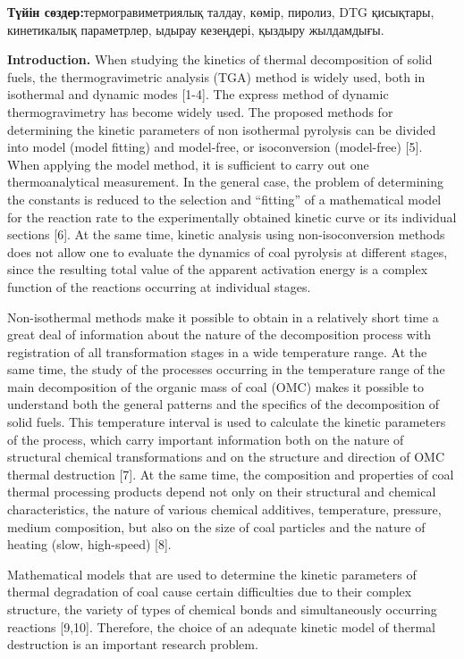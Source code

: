 {\bfseries Түйін сөздер:}термогравиметриялық талдау, көмір, пиролиз, DTG
қисықтары, кинетикалық параметрлер, ыдырау кезеңдері, қыздыру
жылдамдығы.

{\bfseries Introduction.} When studying the kinetics of thermal
decomposition of solid fuels, the thermogravimetric analysis (TGA)
method is widely used, both in isothermal and dynamic modes {[}1-4{]}.
The express method of dynamic thermogravimetry has become widely used.
The proposed methods for determining the kinetic parameters of non
isothermal pyrolysis can be divided into model (model fitting) and
model-free, or isoconversion (model-free) {[}5{]}. When applying the
model method, it is sufficient to carry out one thermoanalytical
measurement. In the general case, the problem of determining the
constants is reduced to the selection and ``fitting'' of a mathematical
model for the reaction rate to the experimentally obtained kinetic curve
or its individual sections {[}6{]}. At the same time, kinetic analysis
using non-isoconversion methods does not allow one to evaluate the
dynamics of coal pyrolysis at different stages, since the resulting
total value of the apparent activation energy is a complex function of
the reactions occurring at individual stages.

Non-isothermal methods make it possible to obtain in a relatively short
time a great deal of information about the nature of the decomposition
process with registration of all transformation stages in a wide
temperature range. At the same time, the study of the processes
occurring in the temperature range of the main decomposition of the
organic mass of coal (OMC) makes it possible to understand both the
general patterns and the specifics of the decomposition of solid fuels.
This temperature interval is used to calculate the kinetic parameters of
the process, which carry important information both on the nature of
structural chemical transformations and on the structure and direction
of OMC thermal destruction {[}7{]}. At the same time, the composition
and properties of coal thermal processing products depend not only on
their structural and chemical characteristics, the nature of various
chemical additives, temperature, pressure, medium composition, but also
on the size of coal particles and the nature of heating (slow,
high-speed) {[}8{]}.

Mathematical models that are used to determine the kinetic parameters of
thermal degradation of coal cause certain difficulties due to their
complex structure, the variety of types of chemical bonds and
simultaneously occurring reactions {[}9,10{]}. Therefore, the choice of
an adequate kinetic model of thermal destruction is an important
research problem.

